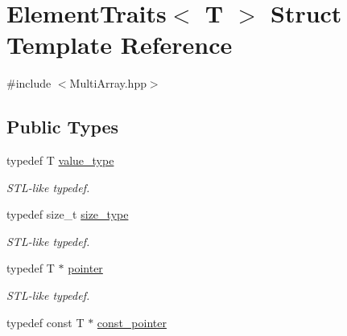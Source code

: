 \hypertarget{struct_d_o_1_1_element_traits}{\section{Element\-Traits$<$ T $>$ Struct Template Reference}
\label{struct_d_o_1_1_element_traits}
}


{\ttfamily \#include $<$Multi\-Array.\-hpp$>$}

\subsection*{Public Types}
\begin{DoxyCompactItemize}
\item 
\hypertarget{struct_d_o_1_1_element_traits_a265a253612b46abed17c61b0a5e5ce30}{typedef T \hyperlink{struct_d_o_1_1_element_traits_a265a253612b46abed17c61b0a5e5ce30}{value\-\_\-type}}\label{struct_d_o_1_1_element_traits_a265a253612b46abed17c61b0a5e5ce30}

\begin{DoxyCompactList}\small\item\em S\-T\-L-\/like typedef. \end{DoxyCompactList}\item 
\hypertarget{struct_d_o_1_1_element_traits_a49b489a408a211a90e766329c0732d7b}{typedef size\-\_\-t \hyperlink{struct_d_o_1_1_element_traits_a49b489a408a211a90e766329c0732d7b}{size\-\_\-type}}\label{struct_d_o_1_1_element_traits_a49b489a408a211a90e766329c0732d7b}

\begin{DoxyCompactList}\small\item\em S\-T\-L-\/like typedef. \end{DoxyCompactList}\item 
\hypertarget{struct_d_o_1_1_element_traits_a680c78d51cff3fd301666dd75bdbe49d}{typedef T $\ast$ \hyperlink{struct_d_o_1_1_element_traits_a680c78d51cff3fd301666dd75bdbe49d}{pointer}}\label{struct_d_o_1_1_element_traits_a680c78d51cff3fd301666dd75bdbe49d}

\begin{DoxyCompactList}\small\item\em S\-T\-L-\/like typedef. \end{DoxyCompactList}\item 
\hypertarget{struct_d_o_1_1_element_traits_a53d259f0075b22d7646e373816830e8e}{typedef const T $\ast$ \hyperlink{struct_d_o_1_1_element_traits_a53d259f0075b22d7646e373816830e8e}{const\-\_\-pointer}}\label{struct_d_o_1_1_element_traits_a53d259f0075b22d7646e373816830e8e}


\end{DoxyCompactItemize}
